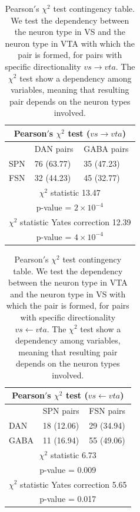 \begin{table}[H]
\begin{tabular}{ |p{3cm}|p{3cm}|p{3cm}| }
 \hline
 \multicolumn{3}{|c|}{Pearson$'$s $\chi^2$ test ($vs \rightarrow vta$)} \\
 \hline
 & DAN pairs & GABA pairs\\
 \hline
 SPN & 76 (63.77) & 35 (47.23) \\
 \hline
 FSN & 32 (44.23) & 45 (32.77)\\
 \hline
 \multicolumn{3}{|c|}{$\chi^2$ statistic  13.47}\\
 \multicolumn{3}{|c|}{p-value = $2\times10^{-4}$}\\
 \hline
 \multicolumn{3}{|c|}{$\chi^2$ statistic Yates correction 12.39}\\
 \multicolumn{3}{|c|}{p-value = $4\times10^{-4}$}\\
 \hline
\end{tabular}
\caption{Pearson$'$s $\chi^{2}$ test contingency table. We test the dependency between the neuron type in VS and the neuron type in VTA with which the pair is formed, for pairs with specific directionality $vs \rightarrow vta$. The $\chi^2$ test show a dependency among variables, meaning that resulting pair depends on the neuron types involved.}
\label{tab:chisquare_vsvta}
\end{table}

\begin{table}[H]
\begin{tabular}{ |p{3cm}|p{3cm}|p{3cm}| }
 \hline
 \multicolumn{3}{|c|}{Pearson$'$s $\chi^2$ test ($vs \leftarrow vta$)} \\
 \hline
 & SPN pairs & FSN pairs\\
 \hline
 DAN & 18 (12.06) & 29 (34.94) \\
 \hline
 GABA & 11 (16.94) & 55 (49.06)\\
 \hline
 \multicolumn{3}{|c|}{$\chi^2$ statistic  6.73}\\
 \multicolumn{3}{|c|}{p-value = 0.009}\\
 \hline
 \multicolumn{3}{|c|}{$\chi^2$ statistic Yates correction 5.65}\\
 \multicolumn{3}{|c|}{p-value = 0.017}\\
 \hline
\end{tabular}
\caption{Pearson$'$s $\chi^{2}$ test contingency table. We test the dependency between the neuron type in VTA and the neuron type in VS with which the pair is formed, for pairs with specific directionality $vs \leftarrow vta$. The $\chi^2$ test show a dependency among variables, meaning that resulting pair depends on the neuron types involved.}
\label{tab:chisquare_vtavs}
\end{table}
